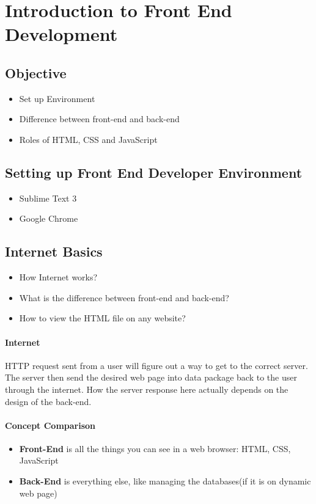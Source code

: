 \documentclass{article}
\begin{document}
\section{Introduction to Front End Development}

\subsection*{Objective}
\begin{itemize}
\item Set up Environment
\item Difference between front-end and back-end
\item Roles of HTML, CSS and JavaScript
\end{itemize}



\subsection{Setting up Front End Developer Environment}
\begin{itemize}
	\item Sublime Text 3
	\item Google Chrome
\end{itemize}

\subsection{Internet Basics}
\begin{itemize}
	\item How Internet works?
	\item What is the difference between front-end and back-end?
	\item How to view the HTML file on any website?
\end{itemize}

\paragraph{Internet}
HTTP request sent from a user will figure out a way to get to the correct server. The server then send the desired web page into data package back to the user through the internet. How the server response here actually depends on the design of the back-end.

\paragraph{Concept Comparison}
\begin{itemize}
	\item \textbf{Front-End} is all the things you can see in a web browser: HTML, CSS, JavaScript
	\item \textbf{Back-End} is everything else, like managing the databases(if it is on dynamic web page)
\end{itemize}
\end{document}

